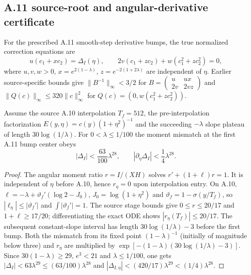 \subsection*{A.11 source-root and angular-derivative certificate}
\label{subsec:a11-rootjet-new-20261021}
For the prescribed A.11 smooth-step derivative bumps, the true
normalized correction equations are
\[
 u(c_1+xc_2)=\Delta_I(\eta),\qquad
 2v(c_1+zc_2)+w(c_1^2+zc_2^2)=0,
\]
where $u,v,w>0$, $x=e^{2(1-\lambda)}$,
$z=e^{-2(1+2\lambda)}$ are independent of $\eta$.
Earlier source-specific bounds give
$\|B^{-1}\|_\infty<3/2$ for
$B=\left(\begin{smallmatrix}u&ux\\2v&2vz\end{smallmatrix}\right)$
and $\|Q(c)\|_\infty\le320\|c\|_\infty^2$ for
$Q(c)=(0,w(c_1^2+zc_2^2))$.

\begin{lemma}
\label{lem:a11-rootjet-delta-new}
Assume the source A.10 interpolation $T_f=512$, the
pre-interpolation factorization $E(y,\eta)=c(y)(1+\eta^2)^{-1}$
and the succeeding $-\lambda$ slope plateau of length
$30\log(1/\lambda)$. For $0<\lambda\le1/100$ the
moment mismatch at the first A.11 bump center obeys
\[
 |\Delta_I|<\frac{63}{100}\lambda^{28},\qquad
 |\partial_\eta\Delta_I|<\frac14\lambda^{28}.
\]
\end{lemma}
\begin{proof}
The angular moment ratio $r=I/(XH)$ solves
$r'+(1+\ell)r=1$. It is independent of $\eta$
before A.10, hence $r_\eta=0$ upon interpolation entry.
On A.10, $\ell=-\lambda+\vartheta_f'(\log2-J_0)$,
$J_0=\log(1+\eta^2)$ and
$\vartheta_f=1-\sigma(y/T_f)$, so
$|\ell_\eta|\le|\vartheta_f'|$ and
$\int|\vartheta_f'|=1$.
The source stage bounds give $0\le r\le20/17$ and
$1+\ell\ge17/20$; differentiating the exact ODE shows
$|r_\eta(T_f)|\le20/17$.
The subsequent constant-slope interval has length
$30\log(1/\lambda)-3$ before the first bump.
Both the mismatch from its fixed point $(1-\lambda)^{-1}$
(initially of magnitude below three) and $r_\eta$
are multiplied by
$\exp[-(1-\lambda)(30\log(1/\lambda)-3)]$.
Since $30(1-\lambda)\ge29$, $e^3<21$
and $\lambda\le1/100$, one gets
$|\Delta_I|<63\lambda^{29}\le(63/100)\lambda^{28}$
and $|\Delta_{I,\eta}|<(420/17)\lambda^{29}
<(1/4)\lambda^{28}$.
\end{proof}

